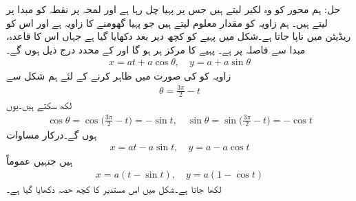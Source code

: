 حل:\quad
ہم  محور کو وہ لکیر لیتے ہیں جس پر پہیا چل رہا ہے اور لمحہ  پر نقطہ  کو مبدا پر لیتے ہیں۔ ہم زاویہ  کو مقدار معلوم لیتے ہیں جو پہیا  گھومنے کا زاویہ ہے اور اس کو ریڈیئن میں ناپا جاتا ہے۔شکل  میں پہیے کو کچھ دیر بعد دکھایا گیا ہے جہاں اس کا قاعدہ، مبدا سے  فاصلہ پر ہے۔ پہیے کا مرکز  ہر ہو گا اور  کے محدد درج ذیل ہوں گے۔
\begin{align*}
x=at+a\cos \theta,\quad y=a+a\sin \theta 
\end{align*}
زاویہ  کو  کی صورت میں ظاہر کرنے کے لئے ہم شکل سے 
\begin{align*}
\theta=\frac{3\pi}{2}-t
\end{align*}
لکھ سکتے ہیں۔یوں
\begin{align*}
\cos\theta=\cos\big(\frac{3\pi}{2}-t\big)=-\sin t,\quad \sin\theta=\sin\big(\frac{3\pi}{2}-t\big)=-\cos t
\end{align*}
ہوں گے۔درکار مساوات 
\begin{align*}
x=at-a\sin t,\quad y=a-a\cos t
\end{align*}
ہیں جنہیں عموماً
\begin{align}\label{مساوات_مخروط_مستدیر_الف}
x=a(t-\sin t),\quad y=a(1-\cos t)
\end{align}
لکھا جاتا ہے۔شکل  میں اس مستدیر کا کچھ حصہ دکھایا گیا ہے۔
